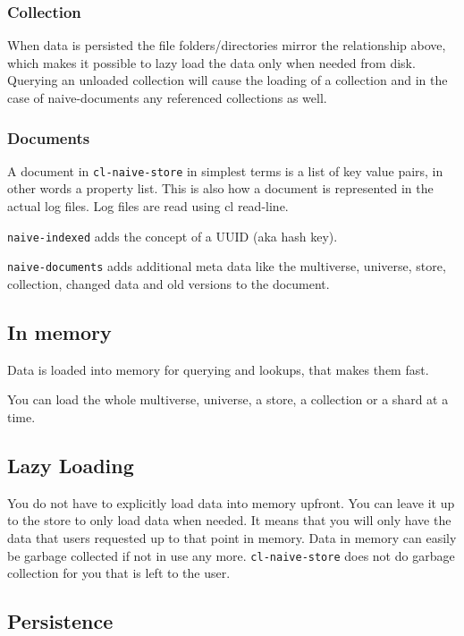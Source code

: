 \documentclass[11pt]{article}
\begin{document}
\subsubsection{Collection}
\label{sec:orge0cb22f}

When data is persisted the file folders/directories mirror the
relationship above, which makes it possible to lazy load the data only
when needed from disk. Querying an unloaded collection will cause the
loading of a collection and in the case of naive-documents any
referenced collections as well.

\subsubsection{Documents}
\label{sec:org26dae6b}

A document in \texttt{cl-naive-store} in simplest terms is a list of key
value pairs, in other words a property list. This is also how a
document is represented in the actual log files. Log files are read
using cl read-line.

\texttt{naive-indexed} adds the concept of a UUID (aka hash key).

\texttt{naive-documents} adds additional meta data like the multiverse,
universe, store, collection, changed data and old versions to the
document.

\subsection{In memory}
\label{sec:org8bd1ce5}

Data is loaded into memory for querying and lookups, that makes them
fast.

You can load the whole multiverse, universe, a store, a collection or a shard at a
time.

\subsection{Lazy Loading}
\label{sec:org24281d1}

You do not have to explicitly load data into memory upfront. You can
leave it up to the store to only load data when needed. It means that
you will only have the data that users requested up to that point in
memory. Data in memory can easily be garbage collected if not in use
any more. \texttt{cl-naive-store} does not do garbage collection for you that
is left to the user.

\subsection{Persistence}
\label{sec:orgad0b04f}
\end{document}
